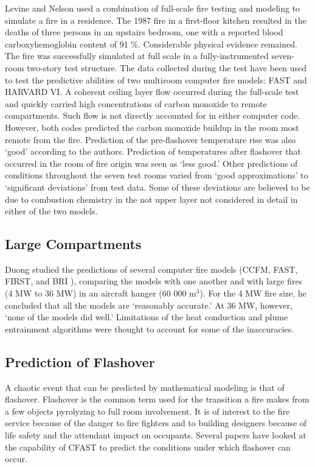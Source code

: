 Levine and Nelson \cite{Valid:Levine} used a combination of full-scale fire testing and modeling to simulate a fire in a residence. The 1987 fire in a first-floor kitchen resulted in the deaths of three persons in an upstairs bedroom, one with a reported blood carboxyhemoglobin content of 91 \%. Considerable physical evidence remained. The fire was successfully simulated at full scale in a fully-instrumented seven-room two-story test structure. The data collected during the test have been used to test the predictive abilities of two multiroom computer fire models: FAST and HARVARD VI. A coherent ceiling layer flow occurred during the full-scale test and quickly carried high concentrations of carbon monoxide to remote compartments. Such flow is not directly accounted for in either computer code. However, both codes predicted the carbon monoxide buildup in the room most remote from the fire. Prediction of the pre-flashover temperature rise was also `good' according to the authors. Prediction of temperatures after flashover that occurred in the room of fire origin was seen as `less good.' Other predictions of conditions throughout the seven test rooms varied from `good approximations' to `significant deviations' from test data. Some of these deviations are believed to be due to combustion chemistry in the not upper layer not considered in detail in either of the two models.

\subsection{Large Compartments}

Duong \cite{Valid:Duong} studied the predictions of several computer fire models (CCFM, FAST, FIRST, and BRI \cite{Models:BRI}), comparing the models with one another and with large fires (4 MW to 36 MW) in an aircraft hanger (60 000 m$^3$). For the 4 MW fire size, he concluded that all the models are `reasonably accurate.' At 36 MW, however, `none of the models did well.' Limitations of the heat conduction and plume entrainment algorithms were thought to account for some of the inaccuracies.

\subsection{Prediction of Flashover}

A chaotic event that can be predicted by mathematical modeling is that of flashover. Flashover is the common term used for the transition a fire makes from a few objects pyrolyzing to full room involvement. It is of interest to the fire service because of the danger to fire fighters and to building designers because of life safety and the attendant impact on occupants. Several papers have looked at the capability of CFAST to predict the conditions under which flashover can occur.

